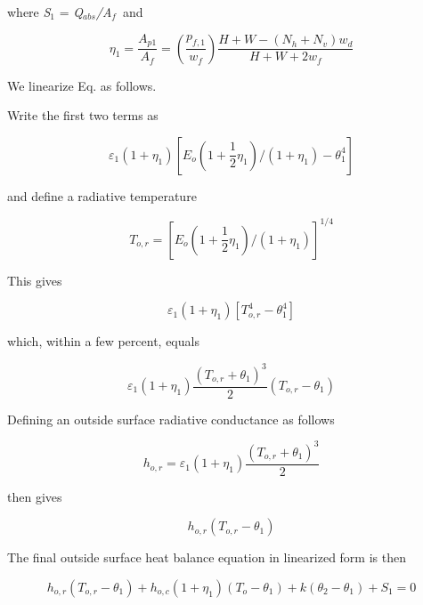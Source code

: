 where \emph{S\(_{1}\)} = \emph{Q\(_{abs}\)/A\(_{f}\)}~and

\begin{equation}
{\eta_1} = \frac{{{A_{p1}}}}{{{A_f}}} = \left( {\frac{{{p_{f,1}}}}{{{w_f}}}} \right)\frac{{H + W - ({N_h} + {N_v}){w_d}}}{{H + W + 2{w_f}}}
\end{equation}

We linearize Eq. as follows.

Write the first two terms as

\begin{equation}
{\varepsilon_1}(1 + {\eta_1})[{E_o}(1 + \frac{1}{2}{\eta_1})/(1 + {\eta_1}) - \theta_1^4]
\end{equation}

and define a radiative temperature

\begin{equation}
{T_{o,r}} = {[{E_o}(1 + \frac{1}{2}{\eta_1})/(1 + {\eta_1})]^{1/4}}
\end{equation}

This gives

\begin{equation}
{\varepsilon_1}(1 + {\eta_1})[T_{o,r}^4 - \theta_1^4]
\end{equation}

which, within a few percent, equals

\begin{equation}
{\varepsilon_1}(1 + {\eta_1})\frac{{{{({T_{o,r}} + {\theta_1})}^3}}}{2}({T_{o,r}} - {\theta_1})
\end{equation}

Defining an outside surface radiative conductance as follows

\begin{equation}
{h_{o,r}} = {\varepsilon_1}(1 + {\eta_1})\frac{{{{({T_{o,r}} + {\theta_1})}^3}}}{2}
\end{equation}

then gives

\begin{equation}
{h_{o,r}}({T_{o,r}} - {\theta_1})
\end{equation}

The final outside surface heat balance equation in linearized form is then

\begin{equation}
{h_{o,r}}({T_{o,r}} - {\theta_1}) + {h_{o,c}}(1 + {\eta_1})({T_o} - {\theta_1}) + k({\theta_2} - {\theta_1}) + {S_1} = 0
\end{equation}

